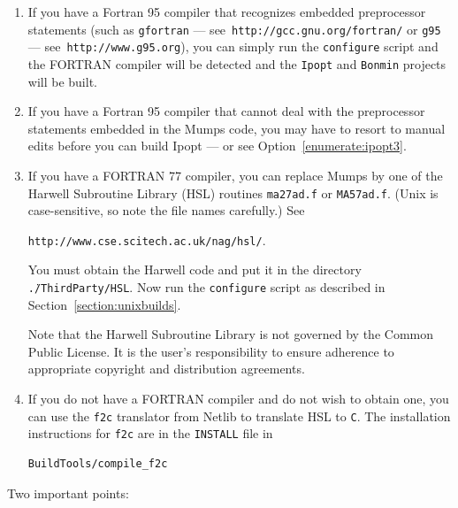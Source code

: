 \documentclass[11pt]{article}
\renewcommand{\_}{{\char"5F}}
\renewcommand{\{}{{\char"7B}}
\renewcommand{\}}{{\char"7D}}
\renewcommand{\^}{{\char"0D}}
\renewcommand{\'}{{\char"0D}}
\newif\ifipopt  \ipopttrue      %
\newcommand{\UrlGgs}{http://www.g95.org}
\newcommand{\UrlGfortran}{http://gcc.gnu.org/fortran/}
\newcommand{\UrlHsl}{http://www.cse.scitech.ac.uk/nag/hsl/}
\begin{document}
\begin{enumerate}[{Option} 1.]

\item{}   If you \ifipopt\else are building in a Unix-like environment and \fi have a Fortran 95 compiler that
recognizes embedded preprocessor statements (such as {\tt gfortran} --- see~{\tt\UrlGfortran}
or {\tt g95} --- see~{\tt\UrlGgs}), you can simply run the {\tt configure} script and the FORTRAN
compiler will be detected and the {\tt Ipopt} and {\tt Bonmin} projects will be built.

\item{}   If you have a Fortran 95 compiler that cannot deal with the preprocessor statements embedded in the
Mumps code,
you may have to resort to manual edits before you can build Ipopt --- or see Option~\ref{enumerate:ipopt3}.

\item{} \label{enumerate:ipopt3}
If you have a FORTRAN 77 compiler, you can replace Mumps by one of the Harwell Subroutine Library (HSL)%
 routines {\tt ma27ad.f} or {\tt MA57ad.f}. 
(Unix is case-sensitive, so note the file names carefully.) See

{\tt\UrlHsl}.  

You must obtain the Harwell code and put it in the directory {\tt \../ThirdParty/HSL}.  
Now run the {\tt configure} script as described in Section~\ref{section:unixbuilds}.

Note that the Harwell Subroutine Library is not governed by the Common Public License. It is the user's responsibility
to ensure adherence to appropriate copyright and distribution agreements.

\item{} \label{enumerate:ipopt4}
If you do not have a FORTRAN compiler and do not wish to obtain one, you can use the {\tt f2c}
translator from Netlib to translate HSL to {\tt C}.  The installation instructions for {\tt f2c}
are in the {\tt INSTALL} file in
\begin{verbatim}
BuildTools/compile_f2c
\end{verbatim}

\end{enumerate}

\noindent Two important points:
\end{document}
